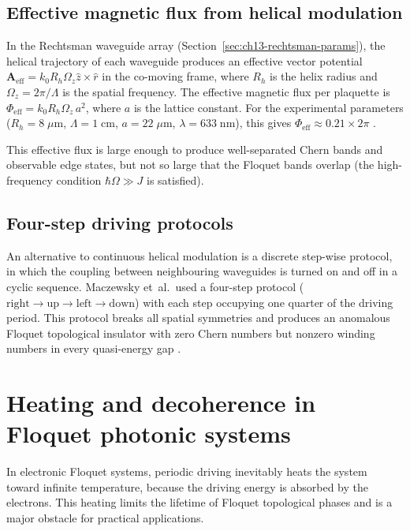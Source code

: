 \subsection{Effective magnetic flux from helical modulation}
\label{sec:ch13-helical-flux}

In the Rechtsman waveguide array (Section~\ref{sec:ch13-rechtsman-params}),
the helical trajectory of each waveguide produces an effective
vector potential $\mathbf{A}_{\mathrm{eff}}=k_0 R_h\Omega_z\hat{z}
\times\hat{r}$ in the co-moving frame, where $R_h$ is the helix
radius and $\Omega_z=2\pi/\Lambda$ is the spatial frequency.  The
effective magnetic flux per plaquette is
$\Phi_{\mathrm{eff}}=k_0 R_h\Omega_z\,a^2$, where $a$ is the lattice
constant.  For the experimental parameters ($R_h=8\;\mu\mathrm{m}$,
$\Lambda=1\;\mathrm{cm}$, $a=22\;\mu\mathrm{m}$,
$\lambda=633\;\mathrm{nm}$), this gives
$\Phi_{\mathrm{eff}}\approx 0.21\times 2\pi$
\cite{rechtsman2013photonica,ozawa2018topological}.

This effective flux is large enough to produce well-separated Chern
bands and observable edge states, but not so large that the Floquet
bands overlap (the high-frequency condition
$\hbar\Omega\gg J$ is satisfied).

\subsection{Four-step driving protocols}
\label{sec:ch13-four-step}

An alternative to continuous helical modulation is a discrete
step-wise protocol, in which the coupling between neighbouring
waveguides is turned on and off in a cyclic sequence.  Maczewsky
et~al.\ used a four-step protocol
($\mathrm{right}\to\mathrm{up}\to\mathrm{left}\to\mathrm{down}$)
with each step occupying one quarter of the driving period.  This
protocol breaks all spatial symmetries and produces an anomalous
Floquet topological insulator with zero Chern numbers but nonzero
winding numbers in every quasi-energy gap
\cite{maczewsky2017observation,kitagawa2010topological}.

\section{Heating and decoherence in Floquet photonic systems}
\label{sec:ch13-heating}

In electronic Floquet systems, periodic driving inevitably heats the
system toward infinite temperature, because the driving energy is
absorbed by the electrons.  This heating limits the lifetime of
Floquet topological phases and is a major obstacle for practical
applications.

